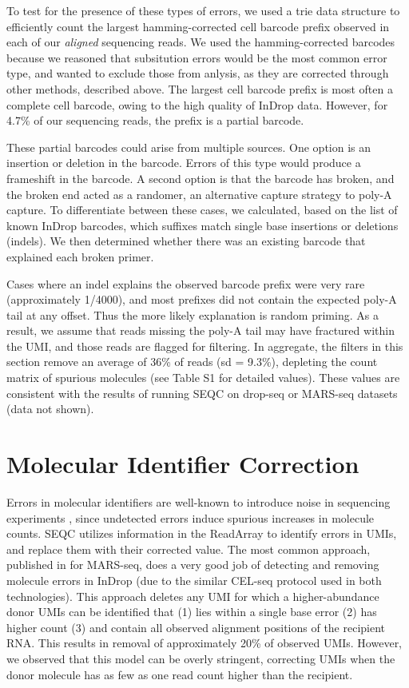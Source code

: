 To test for the presence of these types of errors, we used a {\mono trie} data structure to efficiently count the largest hamming-corrected cell barcode prefix observed in each of our \textit{aligned} sequencing reads. 
We used the hamming-corrected barcodes because we reasoned that subsitution errors would be the most common error type, and wanted to exclude those from anlysis, as they are corrected through other methods, described above. 
The largest cell barcode prefix is most often a complete cell barcode, owing to the high quality of InDrop data. 
However, for 4.7\% of our sequencing reads, the prefix is a partial barcode.  %

These partial barcodes could arise from multiple sources. 
One option is an insertion or deletion in the barcode. 
Errors of this type would produce a frameshift in the barcode. 
A second option is that the barcode has broken, and the broken end acted as a randomer, an alternative capture strategy to poly-A capture. 
To differentiate between these cases, we calculated, based on the list of known InDrop barcodes, which suffixes match single base insertions or deletions (indels). 
We then determined whether there was an existing barcode that explained each broken primer. 

Cases where an indel explains the observed barcode prefix were very rare (approximately 1/4000), and most prefixes did not contain the expected poly-A tail at any offset. 
Thus the more likely explanation is random priming. 
As a result, we assume that reads missing the poly-A tail may have fractured within the UMI, and those reads are flagged for filtering. 
In aggregate, the filters in this section remove an average of 36\% of reads (sd = 9.3\%), depleting the count matrix of spurious molecules (see Table S1 for detailed values). %
These values are consistent with the results of running SEQC on drop-seq or MARS-seq datasets (data not shown).

\section{Molecular Identifier Correction}

Errors in molecular identifiers are well-known to introduce noise in sequencing experiments \citep{Jaitin2014}, since undetected errors induce spurious increases in molecule counts. 
SEQC utilizes information in the ReadArray to identify errors in UMIs, and replace them with their corrected value. 
The most common approach, published in \citep{Jaitin2014} for MARS-seq, does a very good job of detecting and removing molecule errors in InDrop (due to the similar CEL-seq protocol used in both technologies). 
This approach deletes any UMI for which a higher-abundance donor UMIs can be identified that (1) lies within a single base error (2) has higher count (3) and contain all observed alignment positions of the recipient RNA\@. 
This results in removal of approximately 20\% of observed UMIs. However, we observed that this model can be overly stringent, correcting UMIs when the donor molecule has as few as one read count higher than the recipient.

